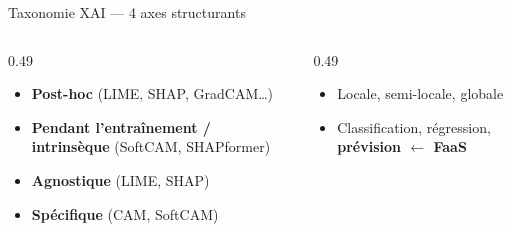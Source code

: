 \documentclass[10pt]{beamer}
\begin{document}
\begin{frame}{Taxonomie XAI — 4 axes structurants}
  \begin{columns}
    \begin{column}{0.49\textwidth}
      \begin{tcolorbox}[colback=blue!3, colframe=blue!40!black, arc=2mm, boxrule=0.5pt,
                        fonttitle=\bfseries, title={Axe 1 — Quand ?}]
        \begin{itemize}
          \item \textbf{Post-hoc} (LIME, SHAP, GradCAM\ldots)
          \item \textbf{Pendant l'entraînement / intrinsèque} (SoftCAM, SHAPformer)
        \end{itemize}
      \end{tcolorbox}
      \begin{tcolorbox}[colback=green!3, colframe=green!40!black, arc=2mm, boxrule=0.5pt,
                        fonttitle=\bfseries, title={Axe 2 — Qui ?}]
        \begin{itemize}
          \item \textbf{Agnostique} (LIME, SHAP)
          \item \textbf{Spécifique} (CAM, SoftCAM)
        \end{itemize}
      \end{tcolorbox}
    \end{column}
    \begin{column}{0.49\textwidth}
      \begin{tcolorbox}[colback=orange!3, colframe=orange!50!black, arc=2mm, boxrule=0.5pt,
                        fonttitle=\bfseries, title={Axe 3 — Portée}]
        \begin{itemize}
          \item Locale, semi-locale, globale
        \end{itemize}
      \end{tcolorbox}
      \begin{tcolorbox}[colback=purple!3, colframe=purple!50!black, arc=2mm, boxrule=0.5pt,
                        fonttitle=\bfseries, title={Axe 4 — Tâche}]
        \begin{itemize}
          \item Classification, régression, \textbf{prévision $\leftarrow$ FaaS}
        \end{itemize}
      \end{tcolorbox}
    \end{column}
  \end{columns}
\end{frame}
\end{document}

